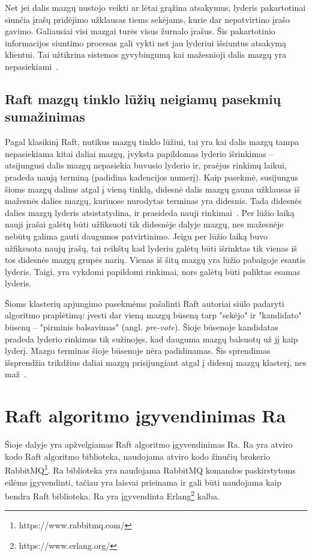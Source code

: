 \documentclass{VUMIFPSkursinis}
\begin{document}
Net jei dalis mazgų nustojo veikti ar lėtai grąžina atsakymus, lyderis pakartotinai siunčia įrašų pridėjimo užklausas tiems sekėjams, kurie dar nepatvirtino įrašo gavimo. Galiausiai visi mazgai turės visus žurnalo įrašus. Šis pakartotinio informacijos siuntimo procesas gali vykti net jau lyderiui išsiuntus atsakymą klientui. Tai užtikrina sistemos gyvybingumą kai mažesnioji dalis mazgų yra nepasiekiami~\cite{ongaro_consensus}.

\subsection{Raft mazgų tinklo lūžių neigiamų pasekmių sumažinimas}

Pagal klasikinį Raft, nutikus mazgų tinklo lūžiui, tai yra kai dalis mazgų tampa nepasiekiama kitai daliai mazgų, įvyksta papildomas lyderio išrinkimas -- atsijungusi dalis mazgų nepasiekia buvusio lyderio ir, praėjus rinkimų laikui, pradeda naują terminą (padidina kadencijos numerį). Kaip pasekmė, susijungus šioms mazgų dalims atgal į vieną tinklą, didesnė dalis mazgų gauna užklausas iš mažesnės dalies mazgų, kuriuose nurodytas terminas yra didesnis. Tada didesnės dalies mazgų lyderis atsistatydina, ir prasideda nauji rinkimai~\cite{ongaro_consensus}. Per lūžio laiką nauji įrašai galėtų būti užfiksuoti tik didesnėje dalyje mazgų, nes mažesnėje nebūtų galima gauti daugumos patvirtinimo. Jeigu per lūžio laiką buvo užfiksuota naujų įrašų, tai reikštų kad lyderiu galėtų būti išrinktas tik vienas iš tos didesnės mazgų grupės narių. Vienas iš šitų mazgų yra lūžio pabaigoje esantis lyderis. Taigi, yra vykdomi papildomi rinkimai, nors galėtų būti paliktas esamas lyderis.

Šioms klasterių apjungimo pasekmėms pašalinti Raft autoriai siūlo padaryti algoritmo praplėtimą: įvesti dar vieną mazgų būseną tarp "sekėjo" ir "kandidato" būsenų -- "pirminis balsavimas" (angl. \textit{pre-vote}). Šioje būsenoje kandidatas pradeda lyderio rinkimus tik sužinojęs, kad dauguma mazgų balsuotų už jį kaip lyderį. Mazgo terminas šioje būsenoje nėra padidinamas. Šis sprendimas išsprendžia trikdžius daliai mazgų prisijungiant atgal į didesnį mazgų klasterį, nes maž~\cite{ongaro_consensus}.

\section{Raft algoritmo įgyvendinimas Ra}

Šioje dalyje yra apžvelgiamas Raft algoritmo įgyvendinimas Ra. Ra yra atviro kodo Raft algoritmo biblioteka, naudojama atviro kodo žinučių brokerio RabbitMQ\footnote{https://www.rabbitmq.com/}. Ra biblioteka yra naudojama RabbitMQ komandos paskirstytoms eilėms įgyvendinti, tačiau yra laisvai prieinama ir gali būti naudojama kaip bendra Raft biblioteka. Ra yra įgyvendinta Erlang\footnote{https://www.erlang.org/} kalba.
\end{document}

